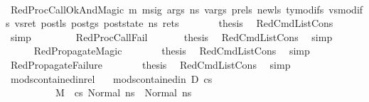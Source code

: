 \begin{isabellebody}
\isanewline
\ \ \ \ \isamarkupfalse%
\ {\isacharparenleft}{\kern0pt}RedProcCallOkAndMagic\ m\ msig\ args\ n{\isacharunderscore}{\kern0pt}s\ v{\isacharunderscore}{\kern0pt}args\ pre{\isacharunderscore}{\kern0pt}ls\ new{\isacharunderscore}{\kern0pt}ls\ ty{\isacharunderscore}{\kern0pt}modifs\ vs{\isacharunderscore}{\kern0pt}modifs\ vs{\isacharunderscore}{\kern0pt}ret\ post{\isacharunderscore}{\kern0pt}ls\ post{\isacharunderscore}{\kern0pt}gs\ post{\isacharunderscore}{\kern0pt}state\ n{\isacharunderscore}{\kern0pt}s{\isacharprime}{\kern0pt}\ rets{\isacharparenright}{\kern0pt}\isanewline
\ \ \ \ \isamarkupfalse%
\ \isamarkupfalse%
\ {\isacharquery}{\kern0pt}thesis\ \isamarkupfalse%
\ RedCmdListCons\ \isamarkupfalse%
\ simp\isanewline
\ \ \isamarkupfalse%
\isanewline
\ \ \ \ \isamarkupfalse%
\ {\isacharparenleft}{\kern0pt}RedProcCallFail\ {\isacharunderscore}{\kern0pt}{\isacharparenright}{\kern0pt}\isanewline
\ \ \ \ \isamarkupfalse%
\ {\isacharquery}{\kern0pt}thesis\ \isamarkupfalse%
\ RedCmdListCons\ \isamarkupfalse%
\ simp\ \isanewline
\ \ \isamarkupfalse%
\isanewline
\ \ \ \ \isamarkupfalse%
\ RedPropagateMagic\isanewline
\ \ \ \ \isamarkupfalse%
\ \isamarkupfalse%
\ {\isacharquery}{\kern0pt}thesis\ \isamarkupfalse%
\ RedCmdListCons\ \isamarkupfalse%
\ simp\isanewline
\ \ \isamarkupfalse%
\isanewline
\ \ \ \ \isamarkupfalse%
\ RedPropagateFailure\isanewline
\ \ \ \ \isamarkupfalse%
\ \isamarkupfalse%
\ {\isacharquery}{\kern0pt}thesis\ \isamarkupfalse%
\ RedCmdListCons\ \isamarkupfalse%
\ simp\isanewline
\ \ \isamarkupfalse%
\isanewline
{}\isamarkupfalse%
%
\endisatagproof
{\isafoldproof}%
%
\isadelimproof
\isanewline
%
\endisadelimproof
\isanewline
{}\isamarkupfalse%
\ mods{\isacharunderscore}{\kern0pt}contained{\isacharunderscore}{\kern0pt}in{\isacharunderscore}{\kern0pt}rel{\isacharcolon}{\kern0pt}\isanewline
\ \ \ {\isachardoublequoteopen}mods{\isacharunderscore}{\kern0pt}contained{\isacharunderscore}{\kern0pt}in\ D\ cs{\isachardoublequoteclose}\ \isanewline
\ \ \ \ \ \ \ \ \ \ {\isachardoublequoteopen}M{\isacharcomma}{\kern0pt}{\isasymLambda}{\isacharcomma}{\kern0pt}{\isasymGamma}{\isacharcomma}{\kern0pt}{\isasymOmega}\ {\isasymturnstile}\ {\isasymlangle}cs{\isacharcomma}{\kern0pt}\ Normal\ ns{\isasymrangle}\ {\isacharbrackleft}{\kern0pt}{\isasymrightarrow}{\isacharbrackright}{\kern0pt}\ Normal\ ns{\isacharprime}{\kern0pt}{\isachardoublequoteclose}\isanewline

\end{isabellebody}
